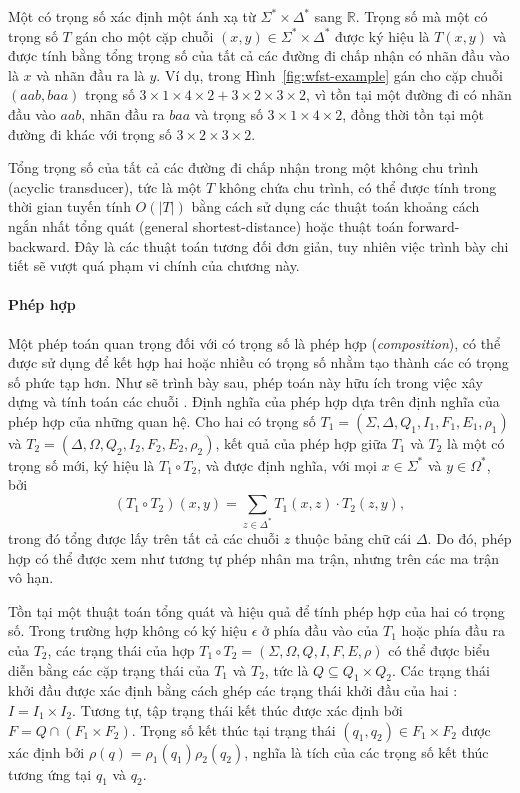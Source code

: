 Một  có trọng số xác định một ánh xạ từ $\Sigma^{*} \times \Delta^{*}$ sang $\mathbb{R}$. Trọng số mà một  có trọng số $T$ gán cho một cặp chuỗi $(x,y)\in \Sigma^{*}\times\Delta^{*}$ được ký hiệu là $T(x,y)$ và được tính bằng tổng trọng số của tất cả các đường đi chấp nhận có nhãn đầu vào là $x$ và nhãn đầu ra là $y$.
Ví dụ,  trong Hình~\ref{fig:wfst-example} gán cho cặp chuỗi $(aab, baa)$ trọng số $3 \times 1 \times 4 \times 2 + 3 \times 2 \times 3 \times 2$, vì tồn tại một đường đi có nhãn đầu vào $aab$, nhãn đầu ra $baa$ và trọng số $3 \times 1 \times 4 \times 2$, đồng thời tồn tại một đường đi khác với trọng số $3 \times 2 \times 3 \times 2$.

Tổng trọng số của tất cả các đường đi chấp nhận trong một  không chu trình (acyclic transducer), tức là một  $T$ không chứa chu trình, có thể được tính trong thời gian tuyến tính $O(|T|)$ bằng cách sử dụng các thuật toán khoảng cách ngắn nhất tổng quát (general shortest-distance) hoặc thuật toán forward-backward. Đây là các thuật toán tương đối đơn giản, tuy nhiên việc trình bày chi tiết sẽ vượt quá phạm vi chính của chương này.

\paragraph{Phép hợp} Một phép toán quan trọng đối với  có trọng số là phép hợp  (\emph{composition}), có thể được sử dụng để kết hợp hai hoặc nhiều  có trọng số nhằm tạo thành các  có trọng số phức tạp hơn. Như sẽ trình bày sau, phép toán này hữu ích trong việc xây dựng và tính toán các chuỗi . Định nghĩa của phép hợp dựa trên định nghĩa của phép hợp của những quan hệ. 
Cho hai  có trọng số $T_1=(\Sigma,\Delta,Q_1,I_1,F_1,E_1,\rho_1)$ và $T_2=(\Delta,\Omega,Q_2,I_2,F_2,E_2,\rho_2)$, kết quả của phép hợp giữa $T_1$ và $T_2$ là một  có trọng số mới, ký hiệu là $T_1 \circ T_2$, và được định nghĩa,
với mọi $x \in \Sigma^{*}$ và $y \in \Omega^{*}$, bởi
\begin{equation}
(T_1 \circ T_2)(x,y)
=
\sum_{z \in \Delta^{*}}
T_1(x,z)\cdot T_2(z,y),
\end{equation}
trong đó tổng được lấy trên tất cả các chuỗi $z$ thuộc bảng chữ cái $\Delta$.
Do đó, phép hợp có thể được xem như tương tự phép nhân ma trận,
nhưng trên các ma trận vô hạn.

Tồn tại một thuật toán tổng quát và hiệu quả để tính phép hợp của hai
 có trọng số. Trong trường hợp không có ký hiệu
$\epsilon$ ở phía đầu vào của $T_1$ hoặc phía đầu ra của $T_2$,
các trạng thái của  hợp 
$T_1 \circ T_2=(\Sigma,\Omega,Q,I,F,E,\rho)$
có thể được biểu diễn bằng các cặp trạng thái của $T_1$ và $T_2$, tức là
$Q \subseteq Q_1 \times Q_2$.
Các trạng thái khởi đầu được xác định bằng cách ghép các trạng thái khởi đầu
của hai :
$I = I_1 \times I_2$.
Tương tự, tập trạng thái kết thúc được xác định bởi
$F = Q \cap (F_1 \times F_2)$.
Trọng số kết thúc tại trạng thái $(q_1,q_2)\in F_1 \times F_2$
được xác định bởi
$\rho(q)=\rho_1(q_1)\rho_2(q_2)$,
nghĩa là tích của các trọng số kết thúc tương ứng tại $q_1$ và $q_2$.

